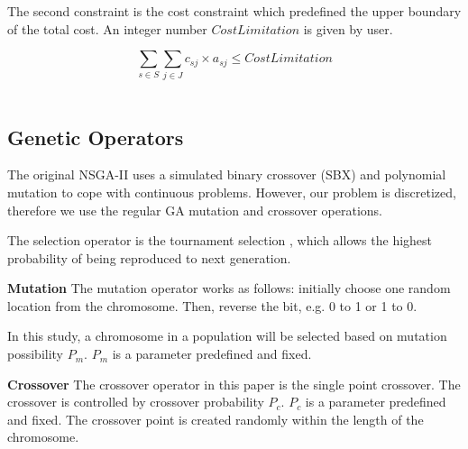 \documentclass{llncs}
\begin{document}
The second constraint is the cost constraint which predefined the upper boundary of the total cost.
An integer number $CostLimitation$ is given by user.

{\centering
	\begin{equation}
		\sum\limits_{s \in S} \sum\limits_{j \in J} c_{sj} \times a_{sj} \leq CostLimitation
	\end{equation}
\\}


\subsection{Genetic Operators}
\label{sec:operators}
 The original NSGA-II uses a simulated 
binary crossover (SBX) \cite{930314} and polynomial mutation \cite{Raghuwanshi04} 
to cope with continuous problems. 
However, our problem is discretized, therefore we use the regular GA mutation and crossover operations.

The selection operator is the tournament selection \cite{Xie:2008:AMI:1389095.1389347}, which allows the highest probability 
of being reproduced to next generation.

\begin{flushleft}\textbf{Mutation} The mutation operator works as follows: initially choose one random location from the chromosome. 
Then, reverse the bit, e.g. 0 to 1 or 1 to 0. 
\end{flushleft}

In this study, a chromosome in a population will be selected based on mutation possibility $P_{m}$. $P_{m}$ is 
a parameter predefined and fixed.
\begin{flushleft}\textbf{Crossover} The crossover operator in this paper is the single point crossover. 
The crossover is controlled by crossover probability $P_{c}$. $P_{c}$ is a parameter predefined and fixed.
The crossover point is created randomly within the length of the chromosome. 
\end{flushleft}
\end{document}

